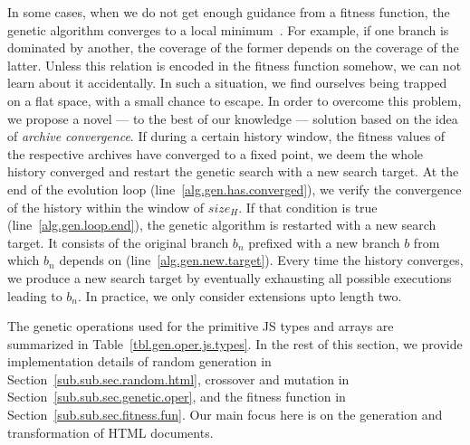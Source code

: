 \documentclass[sigconf,review]{acmart}
\begin{document}
In some cases, when we do not get enough guidance from a fitness function, the genetic algorithm converges to a local minimum~\cite{mcminn2004search}. For example, if one branch is dominated by another, the coverage of the former depends on the coverage of the latter. Unless this relation is encoded in the fitness function somehow, we can not learn about it accidentally. In such a situation, we find ourselves being trapped on a flat space, with a small chance to escape. In order to overcome this problem, we propose a novel --- to the best of our knowledge --- solution based on the idea of \emph{archive convergence}. If during a certain history window, the fitness values of the respective archives have converged to a fixed point, we deem the whole history converged and restart the genetic search with a new search target. At the end of the evolution loop (line~\ref{alg.gen.has.converged}), we verify the convergence of the history within the window of $size_H$. If that condition is true (line~\ref{alg.gen.loop.end}), the genetic algorithm is restarted with a new search target. It consists of the original branch $b_n$ prefixed with a new branch $b$ from which $b_n$ depends on (line~\ref{alg.gen.new.target}). Every time the history converges, we produce a new search target by eventually exhausting all possible executions leading to $b_n$. In practice, we only consider extensions upto length two.

The genetic operations used for the primitive JS types and arrays are summarized in Table~\ref{tbl.gen.oper.js.types}. In the rest of this section, we provide implementation details of random generation in Section~\ref{sub.sub.sec.random.html}, crossover and mutation in Section~\ref{sub.sub.sec.genetic.oper}, and the fitness function in Section~\ref{sub.sub.sec.fitness.fun}. Our main focus here is on the generation and transformation of HTML documents. 
\end{document}
